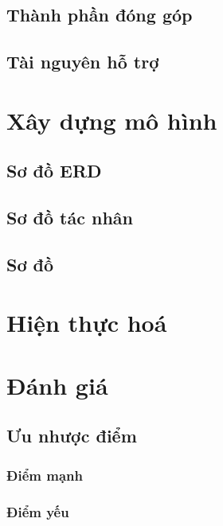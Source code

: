 \documentclass[12pt,a4paper,2sides]{report}
\begin{document}
\subsection{Thành phần đóng góp} %
\subsection{Tài nguyên hỗ trợ} %
\section{Xây dựng mô hình} %
\subsection{Sơ đồ ERD}
\subsection{Sơ đồ tác nhân}
\subsection{Sơ đồ} %

\section{Hiện thực hoá}
\subsection{}

\section{Đánh giá}
\subsection{Ưu nhược điểm}
\subsubsection{Điểm mạnh}
\subsubsection{Điểm yếu}
\end{document}
